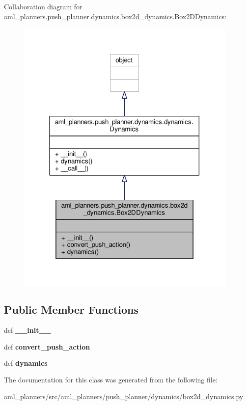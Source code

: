 Collaboration diagram for aml\-\_\-planners.\-push\-\_\-planner.\-dynamics.\-box2d\-\_\-dynamics.\-Box2\-D\-Dynamics\-:
\nopagebreak
\begin{figure}[H]
\begin{center}
\leavevmode
\includegraphics[width=308pt]{classaml__planners_1_1push__planner_1_1dynamics_1_1box2d__dynamics_1_1_box2_d_dynamics__coll__graph}
\end{center}
\end{figure}
\subsection*{Public Member Functions}
\begin{DoxyCompactItemize}
\item 
\hypertarget{classaml__planners_1_1push__planner_1_1dynamics_1_1box2d__dynamics_1_1_box2_d_dynamics_af99f33d0101270e778152f7b0dabe905}{def {\bfseries \-\_\-\-\_\-init\-\_\-\-\_\-}}\label{classaml__planners_1_1push__planner_1_1dynamics_1_1box2d__dynamics_1_1_box2_d_dynamics_af99f33d0101270e778152f7b0dabe905}

\item 
\hypertarget{classaml__planners_1_1push__planner_1_1dynamics_1_1box2d__dynamics_1_1_box2_d_dynamics_a55d07bb7180829e1e5e37f98a7471e91}{def {\bfseries convert\-\_\-push\-\_\-action}}\label{classaml__planners_1_1push__planner_1_1dynamics_1_1box2d__dynamics_1_1_box2_d_dynamics_a55d07bb7180829e1e5e37f98a7471e91}

\item 
\hypertarget{classaml__planners_1_1push__planner_1_1dynamics_1_1box2d__dynamics_1_1_box2_d_dynamics_a1d4739e2adbb9f88578ddc1e2e50397e}{def {\bfseries dynamics}}\label{classaml__planners_1_1push__planner_1_1dynamics_1_1box2d__dynamics_1_1_box2_d_dynamics_a1d4739e2adbb9f88578ddc1e2e50397e}

\end{DoxyCompactItemize}


The documentation for this class was generated from the following file\-:\begin{DoxyCompactItemize}
\item 
aml\-\_\-planners/src/aml\-\_\-planners/push\-\_\-planner/dynamics/box2d\-\_\-dynamics.\-py\end{DoxyCompactItemize}
